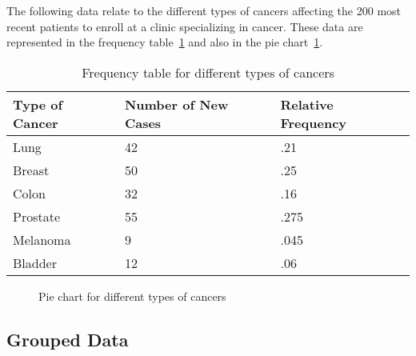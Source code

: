 \begin{example}
  The following data relate to the different types of cancers affecting the 200
  most recent patients to enroll at a clinic specializing in cancer. These data
  are represented in the frequency table~\ref{tbl:different-types-of-cancers}
  and also in the pie chart~\ref{fig:pie-chart-different-types-of-cancers}.
  \begin{table}[H]
    \centering
    \begin{tabular}{lll}
      \toprule
      Type of Cancer & Number of New Cases & Relative Frequency \\
      \midrule
      Lung           & 42                  & .21  \\
      Breast         & 50                  & .25  \\
      Colon          & 32                  & .16  \\
      Prostate       & 55                  & .275 \\
      Melanoma       & 9                   & .045 \\
      Bladder        & 12                  & .06  \\
      \bottomrule
    \end{tabular}
    \caption{Frequency table for different types of cancers}
    \label{tbl:different-types-of-cancers}
  \end{table}
  \begin{figure}[H]
    \centering
    \caption{Pie chart for different types of cancers}
    \label{fig:pie-chart-different-types-of-cancers}
  \end{figure}
\end{example}

\subsection{Grouped Data}\label{ssec:grouped-data}



